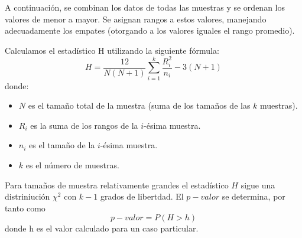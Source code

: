 \documentclass[
  letterpaper,
  DIV=11,
  numbers=noendperiod]{scrreprt}
\providecommand{\tightlist}{%
  \setlength{\itemsep}{0pt}\setlength{\parskip}{0pt}}\usepackage{longtable,booktabs,array}
\begin{document}
A continuación, se combinan los datos de todas las muestras y se ordenan
los valores de menor a mayor. Se asignan rangos a estos valores,
manejando adecuadamente los empates (otorgando a los valores iguales el
rango promedio).

Calculamos el estadístico H utilizando la siguiente fórmula: \[
     H = \frac{12}{N(N+1)} \sum_{i=1}^{k} \frac{R_i^2}{n_i} - 3(N+1)
\] donde:

\begin{itemize}
\tightlist
\item
  \(N\) es el tamaño total de la muestra (suma de los tamaños de las
  \(k\) muestras).
\item
  \(R_i\) es la suma de los rangos de la \(i\)-ésima muestra.
\item
  \(n_i\) es el tamaño de la \(i\)-ésima muestra.
\item
  \(k\) es el número de muestras.
\end{itemize}

Para tamaños de muestra relativamente grandes el estadístico \(H\) sigue
una distriniución \(\chi^2\) con \(k-1\) grados de libertdad. El
\(p-valor\) se determina, por tanto como \[
p-valor=P(H>h)
\] donde h es el valor calculado para un caso particular.
\end{document}
